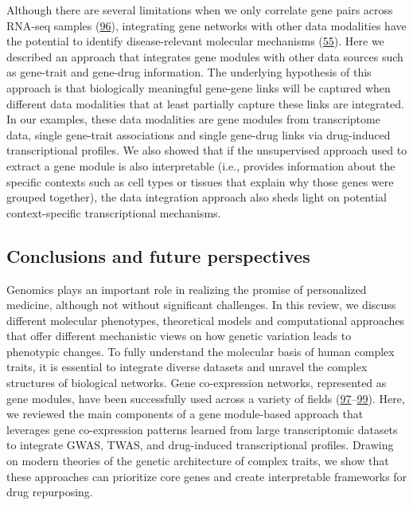 Although there are several limitations when we only correlate gene pairs across RNA-seq samples (\protect\hyperlink{ref-jVQ2rMqc}{96}), integrating gene networks with other data modalities have the potential to identify disease-relevant molecular mechanisms (\protect\hyperlink{ref-dg9nKuy0}{55}).
Here we described an approach that integrates gene modules with other data sources such as gene-trait and gene-drug information.
The underlying hypothesis of this approach is that biologically meaningful gene-gene links will be captured when different data modalities that at least partially capture these links are integrated.
In our examples, these data modalities are gene modules from transcriptome data, single gene-trait associations and single gene-drug links via drug-induced transcriptional profiles.
We also showed that if the unsupervised approach used to extract a gene module is also interpretable (i.e., provides information about the specific contexts such as cell types or tissues that explain why those genes were grouped together), the data integration approach also sheds light on potential context-specific transcriptional mechanisms.

\hypertarget{conclusions-and-future-perspectives}{%
\subsection{Conclusions and future perspectives}\label{conclusions-and-future-perspectives}}

Genomics plays an important role in realizing the promise of personalized medicine, although not without significant challenges.
In this review, we discuss different molecular phenotypes, theoretical models and computational approaches that offer different mechanistic views on how genetic variation leads to phenotypic changes.
To fully understand the molecular basis of human complex traits, it is essential to integrate diverse datasets and unravel the complex structures of biological networks.
Gene co-expression networks, represented as gene modules, have been successfully used across a variety of fields (\protect\hyperlink{ref-CqvNaEqc}{97}--\protect\hyperlink{ref-E1tpJnqG}{99}).
Here, we reviewed the main components of a gene module-based approach that leverages gene co-expression patterns learned from large transcriptomic datasets to integrate GWAS, TWAS, and drug-induced transcriptional profiles.
Drawing on modern theories of the genetic architecture of complex traits, we show that these approaches can prioritize core genes and create interpretable frameworks for drug repurposing.

